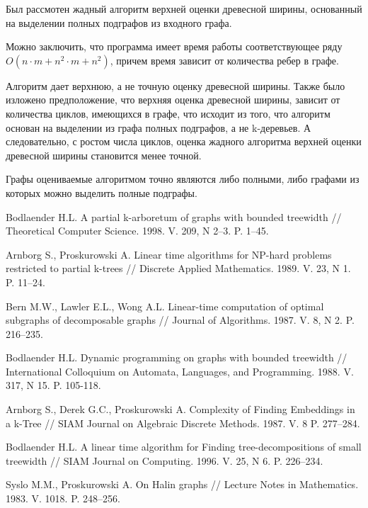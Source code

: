 \documentclass[a4paper,12pt]{article}
\begin{document}
\begin{large}
		Был рассмотен жадный алгоритм верхней оценки древесной ширины, основанный на выделении полных подграфов из входного графа.

		Можно заключить, что программа имеет время работы соответствующее ряду $O(n \cdot m+n^2 \cdot m+n^2)$, причем время зависит от количества ребер в графе.
		
		Алгоритм дает верхнюю, а не точную оценку древесной ширины. Также было изложено предположение, что верхняя оценка древесной ширины, зависит от количества циклов, имеющихся в графе, что исходит из того, что алгоритм основан на выделении из графа полных подграфов, а не k-деревьев. 
		А следовательно, с ростом числа циклов, оценка жадного алгоритма верхней оценки древесной ширины становится менее точной.

		Графы оцениваемые алгоритмом точно являются либо полными, либо графами из которых можно выделить полные подграфы.

		\newpage
		\renewcommand{\baselinestretch}{1.5}

		\begin{thebibliography}{100}

			 Bodlaender H.L. A partial k-arboretum of graphs with bounded treewidth // Theoretical Computer Science. 1998. V. 209, N 2--3. P. 1--45.

			 Arnborg S., Proskurowski A. Linear time algorithms for NP-hard problems restricted to partial k-trees // Discrete Applied Mathematics. 1989. V. 23, N 1. P. 11--24.

			 Bern M.W., Lawler E.L., Wong A.L. Linear-time computation of optimal subgraphs of decomposable graphs // Journal of Algorithms. 1987. V. 8, N 2. P. 216--235.

			 Bodlaender H.L. Dynamic programming on graphs with bounded treewidth // International Colloquium on Automata, Languages, and Programming. 1988. V. 317, N 15. P. 105-118.

			 Arnborg S., Derek G.C., Proskurowski A. Complexity of Finding Embeddings in a k-Tree // SIAM Journal on Algebraic Discrete Methods. 1987. V. 8 P. 277--284.

			 Bodlaender H.L. A linear time algorithm for Finding tree-decompositions of small treewidth // SIAM Journal on Computing. 1996. V. 25, N 6. P. 226--234.

			 Syslo M.M., Proskurowski A. On Halin graphs // Lecture Notes in Mathematics. 1983. V. 1018. P. 248--256.


\end{thebibliography}
\end{large}
\end{document}
